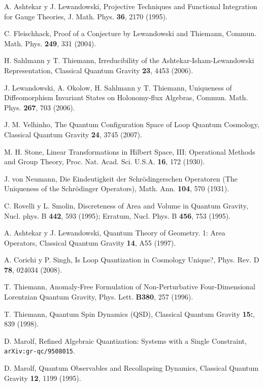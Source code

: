 \begin{thebibliography}{999}
 A. Ashtekar y J. Lewandowski, Projective Techniques and Functional Integration
for Gauge Theories, J. Math. Phys. {\bf36}, 2170 (1995).

 C. Fleischhack, Proof of a Conjecture by Lewandowski and Thiemann, Commun. Math.
Phys. {\bf249}, 331 (2004).

 H. Sahlmann y T. Thiemann, Irreducibility of the Ashtekar-Isham-Lewandowski
Representation, Classical Quantum Gravity {\bf23}, 4453 (2006). 

 J. Lewandowski, A. Okolow, H. Sahlmann y T. Thiemann,
Uniqueness of Diffeomorphism Invariant States on Holonomy-flux Algebras,
Commun. Math. Phys. {\bf267}, 703 (2006).

 J. M. Velhinho, The Quantum Configuration Space of Loop Quantum Cosmology, Classical
Quantum Gravity \textbf{24}, 3745 (2007).

 M. H. Stone,  Linear Transformations in Hilbert Space, III:
Operational Methods and Group Theory, Proc. Nat. Acad. Sci. U.S.A. {\bf16}, 172
(1930).

 J. von Neumann, Die Eindeutigkeit der Schr\"odingerschen
Operatoren (The Uniqueness of the Schr\"odinger Operators), Math. Ann. {\bf104}, 570 (1931).

 C. Rovelli y L. Smolin, Discreteness of Area and Volume in Quantum Gravity, Nucl.
phys. B {\bf442}, 593 (1995); Erratum, Nucl. Phys. B {\bf456}, 753 (1995).

 A. Ashtekar y J. Lewandowski, Quantum Theory of Geometry. 1: Area Operators,
Classical Quantum Gravity {\bf14}, A55 (1997).

 A. Corichi y P. Singh, Is Loop Quantization in Cosmology Unique?, Phys. Rev.
D {\bf 78}, 024034 (2008).

 T. Thiemann, Anomaly-Free Formulation of Non-Perturbative Four-Dimensional
Lorentzian Quantum Gravity, Phys. Lett. {\bf B380}, 257 (1996).

 T. Thiemann, Quantum Spin Dynamics (QSD),
Classical Quantum Gravity {\bf15:}, 839 (1998).

 D. Marolf, Refined Algebraic Quantization: Systems with a Single Constraint,
\texttt{arXiv:gr-qc/9508015}.

 D. Marolf, Quantum Observables and Recollapsing Dynamics,
Classical Quantum Gravity {\bf 12}, 1199 (1995).


\end{thebibliography}
